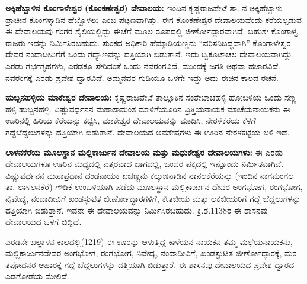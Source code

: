 \textbf{ಅಕ್ಕಿಹೆಬ್ಬಾಳಿನ ಕೊಂಗಾಳೇಶ್ವರ (ಕೊಂಕಣೇಶ್ವರ) ದೇವಾಲಯ:} ಇಂದಿನ ಕೃಷ್ಣರಾಜಪೇಟೆ ತಾ. ನ ಅಕ್ಕಿಹೆಬ್ಬಾಳು ಪ್ರಾಚೀನ ಕೊಂಗಳ್ನಾಡಿನ ಹೆಬ್ಬೊಳಲು ಎಂಬ ಪಟ್ಟಣವಾಗಿತ್ತು. ಈಗ ಕೊಂಕಣೇಶ್ವರ ದೇವಾಲಯವೆಂದು ಕರೆಯಲ್ಪಡುವ ಈ ದೇವಾಲಯವು ಗಂಗರ ಶೈಲಿಯಲ್ಲಿದ್ದು ಈಚೆಗೆ ಮೂಲ ರೂಪದಲ್ಲಿ ಜೀರ್ಣೋದ್ಧಾರವಾಗಿದೆ. ಬಹುಶಃ ಕೊಂಗಾಳ್ವ ರಾಜರು ಇದನ್ನು ನಿರ್ಮಿಸಿರಬಹುದು. ಸುಂಕದ ಅಧಿಕಾರಿ ಹೆಮ್ಮಾಡಿಯಣ್ಣನು “ವರಿಸನಿಬದ್ಧವಾಗಿ” ಕೊಂಗಾಳೇಸ್ವರ ದೇವರ ನಂದಾದೀವಿಗೆಗೆ ಒಂದು ಗದ್ಯಾಣವನ್ನು ದತ್ತಿಯಾಗಿ ಬಿಡುತ್ತಾನೆ. ಇದು ದ್ವಿಕೂಟಾಚಲ ದೇವಾಲಯವಾಗಿದ್ದು, ಎರಡು ಗರ್ಭಗೃಹಗಳು, ಎರಡಕ್ಕೂ ಸೇರಿದಂತೆ ಒಂದು ನವರಂಗವಿದೆ. ಮುಂದಕ್ಕೆ ಜಗತಿ ಅಥವಾ ಹಜಾರವಿದೆ. ನವರಂಗಕ್ಕೆ ಎರಡು ಪ್ರವೇಶ ದ್ವಾರವಿದೆ. ಅಮ್ಮನವರ ಗುಡಿಯೂ ಒಳಗೇ ಇದ್ದು ಅದು ಈಚಿನ ಕಾಲದ ರಚನೆ.

\vskip 3pt

\textbf{ಹುಬ್ಬನಹಳ್ಳಿಯ ಮಾಕೇಶ್ವರ ದೇವಾಲಯ:} ಕೃಷ್ಣರಾಜಪೇಟೆ ತಾಲ್ಲೂಕಿನ ಸಂತೇಬಾಚಹಳ್ಳಿ ಹೋಬಳಿಯ ಒಂದು ಸಣ್ಣ ಹಳ್ಳಿ ಹುಬ್ಬನಹಳ್ಳಿ. ವಿಷ್ಣುವರ್ಧನನ ಮಹಾಸಾಮಂತ ಮಾಳಿಗೆಯೂರಿನ ವ್ರಿತ್ತಿಯನಾಯಕ ಮಾಚೆಯನಾಯಕನು ಈ ಊರಿನಲ್ಲಿ ಹಿರಿಯ ಕೆರೆಯನ್ನು ಕಟ್ಟಿಸಿ, ಮಾಕೇಶ್ವರ ದೇವಾಲಯವನ್ನು ಮಾಡಿಸಿ, ನೇರಳೆಕೆರೆಯ ಕೆಳಗೆ ಗದ್ದೆಬೆದ್ದಲುಗಳನ್ನು ದತ್ತಿಯಾಗಿ ಬಿಡುತ್ತಾನೆ. ದೇವಾಲಯದ ಅವಶೇಷಗಳು ಈ ಊರಿನ ನೇರಳಕಟ್ಟೆಯ ಬಳಿ ಇದೆ.

\vskip 3pt

\textbf{ಲಾಳನಕೆರೆಯ ಮೂಲಸ್ಥಾನ ಮಲ್ಲಿಕಾರ್ಜುನ ದೇವಾಲಯ ಮತ್ತು ಮಧುಕೇಶ್ವರ ದೇವಾಲಯಗಳು:} ಈ ಎರಡು ದೇವಾಲಯಗಳೂ ಊರಿನ ಮಧ್ಯದಲ್ಲಿ ಎತ್ತರವಾದ ಜಾಗದಲ್ಲಿ, ಒಂದರ ಪಕ್ಕದಲ್ಲಿ ಇನ್ನೊಂದು ನಿರ್ಮಿತವಾಗಿವೆ. ವಿಷ್ಣುವರ್ಧನನ ಮಹಾಪ್ರಧಾನ ದಂಡನಾಯಕ ಏಚಣ್ಣನು ಕಲ್ಕುಣಿನಾಡಿನ ನಾನಲಕೆರೆಯನ್ನು (ಇಂದಿನ ನಾಗಮಂಗಲ ತಾ. ಲಾಳಲನಕೆರೆ) ಗೌಡಿಕೆ ಉಂಬಳಿಯಾಗಿ ಪಡೆದು ಮೂಲಸ್ಥಾನ ಮಲ್ಲಿಕಾರ್ಜುನ ದೇವರ ಅಂಗಭೋಗ, ರಂಗಭೋಗ, ನೈವೇದ್ಯ, ನಂದಾದೀವಿಗೆ ಖಂಡಸ್ಫುಟಿತ ಜೀರ್ಣೋದ್ಧಾರಗಳಿಗೆ, ಕೇತಜೀಯ ಮತ್ತು ಲಕ್ಕಜೀಯರಿಗೆ ಗದ್ದೆ ಬೆದ್ದಲುಗಳನ್ನು ದತ್ತಿಯಾಗಿ ಬಿಡುತ್ತಾನೆ. ಇವನೇ ಈ ದೇವಾಲಯವನ್ನು ನಿರ್ಮಿಸಿರಬಹುದು. ಕ್ರಿ.ಶ.1138ರ ಈ ಶಾಸನವು ದೇವಾಲಯದ ಒಳಗೆ ಬಿದ್ದಿದೆ.

\vskip 3pt

ಎರಡನೇ ಬಲ್ಲಾಳನ ಕಾಲದಲ್ಲಿ(1219) ಈ ಊರನ್ನು ಆಳುತ್ತಿದ್ದ ಕಾಳೆಯನ ನಾಯಕನ ತಮ್ಮ ಮಲ್ಲೆಯನಾಯಕನು, ಮಲ್ಲಿಕಾರ್ಜುನದೇವರ ಅಂಗಭೋಗ, ರಂಗಭೋಗ, ನಿವೇದ್ಯ, ನಂದಾದೀವಿಗೆ, ಖಂಡಸ್ಫುಟಿತ ಜೀರ್ಣೋದ್ಧಾರಕ್ಕೆ, ಮಠ ತಪೋಧನರ ಆಹಾರಕ್ಕೆ ಗದ್ದೆ ಬೆದ್ದಲುಗಳನ್ನು ದತ್ತಿಯಾಗಿ ಬಿಡುತ್ತಾರೆ. ಈ ಶಾಸನವು ದೇವಾಲಯದ ಪ್ರವೇಶ ದ್ವಾರದ ಎಡಗೋಡೆಯ ಮೇಲಿದೆ.

